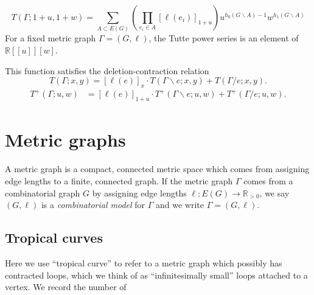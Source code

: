 \documentclass{amsart}
\theoremstyle{definition}
\newcommand{\RR}{\mathbb{R}}
\begin{document}
\begin{equation*}
T(\Gamma; 1+u,1+w) = \sum_{A \subset E(G)} \left( \prod_{e_i \in A} [\ell(e_i)]_{1+u} \right)
u^{h_0(G\backslash A) - 1}w^{h_1(G\backslash A)}
\end{equation*}
For a fixed metric graph $\Gamma = (G,\ell)$, the Tutte power series is an element of 
$\RR[[u]][w]$.

This function satisfies the deletion-contraction relation
\begin{equation*}
T(\Gamma; x,y) = [\ell(e)]_x \cdot T(\Gamma \backslash e; x,y) + T(\Gamma / e; x,y) .
\end{equation*}
\begin{align*}
T^+({\Gamma};u,w) &= 
[\ell(e)]_{1+u} \cdot T^+(\Gamma \backslash e; u,w) 
 + T^+(\Gamma / e; u,w) .
\end{align*}

\section{Metric graphs}
A metric graph is a compact, connected metric space which comes from 
assigning edge lengths to a finite, connected graph.
If the metric graph $\Gamma$
comes from a combinatorial graph $G$ by 
assigning edge lengths $\ell : E(G) \to \RR_{>0}$,
we say $(G,\ell)$ is a {\em combinatorial model} for $\Gamma$
and we write $\Gamma = (G,\ell)$.


\subsection{Tropical curves}

Here we use ``tropical curve'' 
to refer to a metric graph which possibly has contracted loops,
which we think of as ``infinitesimally small'' loops attached to a vertex.
We record the number of 
\end{document}
